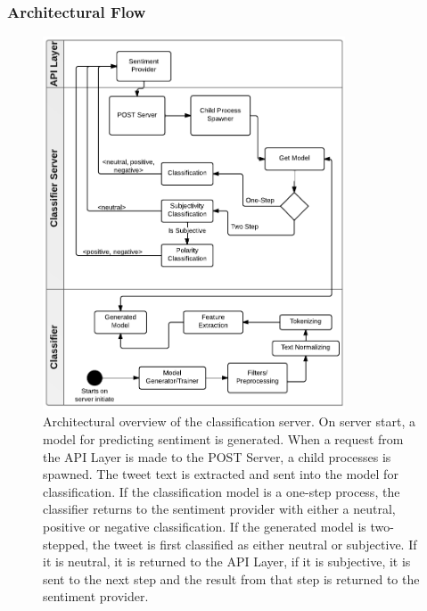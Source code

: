 \subsubsection{Architectural Flow}

\begin{figure}[!htb]
 \begin{center}
     \includegraphics[width=0.8\textwidth]{../img/ClassifierArcitechture30.pdf}
 \end{center}
 \caption[Architectural overview of the classification server.]{Architectural overview of the classification server. On server start, a model for predicting sentiment is generated. When a request from the API Layer is made to the POST Server, a child processes is spawned. The tweet text is extracted and sent into the model for classification. If the classification model is a one-step process, the classifier returns to the sentiment provider with either a neutral, positive or negative classification. If the generated model is two-stepped, the tweet is first classified as either neutral or subjective. If it is neutral, it is returned to the API Layer, if it is subjective, it is sent to the next step and the result from that step is returned to the sentiment provider.}
 \label{fig:ClassifierArcitechture}
\end{figure}

